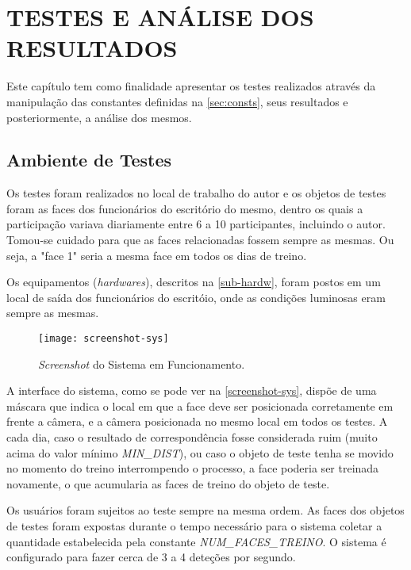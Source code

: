 
\chapter{TESTES E ANÁLISE DOS RESULTADOS}\label{ch:resultados}

Este capítulo tem como finalidade apresentar os testes realizados através da manipulação das constantes definidas na \autoref{sec:consts}, seus resultados e posteriormente, a análise dos mesmos.

\section{Ambiente de Testes}\label{sec:ambtest}

Os testes foram realizados no local de trabalho do autor e os objetos de testes foram as faces dos funcionários do escritório do mesmo, dentro os quais a participação variava diariamente entre 6 a 10 participantes, incluindo o autor. Tomou-se cuidado para que as faces relacionadas fossem sempre as mesmas. Ou seja, a "face 1" seria a mesma face em todos os dias de treino.

Os equipamentos (\textit{hardwares}), descritos na \autoref{sub-hardw}, foram postos em um local de saída dos funcionários do escritóio, onde as condições luminosas eram sempre as mesmas.


\begin{figure}[h]
	\centering
	\texttt{[image: screenshot-sys]}
	\caption{\textit{Screenshot} do Sistema em Funcionamento.}
	\label{screenshot-sys}
\end{figure}


A interface do sistema, como se pode ver na \autoref{screenshot-sys}, dispõe de uma máscara que indica o local em que a face deve ser posicionada corretamente em frente a câmera, e a câmera posicionada no mesmo local em todos os testes. A cada dia, caso o resultado de correspondência fosse considerada ruim (muito acima do valor mínimo \textit{MIN\_DIST}), ou caso o objeto de teste tenha se movido no momento do treino interrompendo o processo, a face poderia ser treinada novamente, o que acumularia as faces de treino do objeto de teste.

Os usuários foram sujeitos ao teste sempre na mesma ordem. As faces dos objetos de testes foram expostas durante o tempo necessário para o sistema coletar a quantidade estabelecida pela constante \textit{NUM\_FACES\_TREINO}. O sistema é configurado para fazer cerca de 3 a 4 deteções por segundo.


